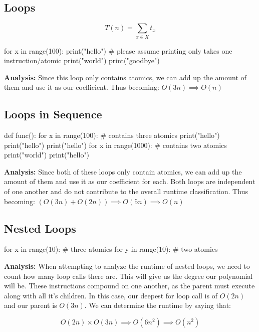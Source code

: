 \documentclass{article}
\begin{document}
\subsection{Loops}

$$T(n) = \sum_{x \in X} t_{x}$$

\begin{flushleft}

\begin{python}
for x in range(100):
    print("hello") # please assume printing only takes one instruction/atomic
    print("world")
    print("goodbye")
\end{python}

\textbf{Analysis:} Since this loop only contains atomics, we can add up the amount of them and use it as our coefficient. Thus becoming: $O(3n) \implies O(n)$

\end{flushleft}

\subsection{Loops in Sequence}

\begin{flushleft}
\begin{python}
def func():
    for x in range(100):
        # contains three atomics
        print("hello")
        print("hello")
        print("hello")
    for x in range(1000):
        # contains two atomics
        print("world")
        print("hello")
\end{python}

\textbf{Analysis:} Since both of these loops only contain atomics, we can add up the amount of them and use it as our coefficient for each. Both loops are independent of one another and do not contribute to the overall runtime classification. Thus becoming: $( O(3n) + O(2n) ) \implies O(5n) \implies O(n)$

\end{flushleft}


\subsection{Nested Loops}

\begin{flushleft}

\begin{python}
for x in range(10):
    # three atomics
    for y in range(10):
        # two atomics
\end{python}

\textbf{Analysis:} When attempting to analyze the runtime of nested loops, we need to count how many loop calls there are. This will give us the degree our polynomial will be. These instructions compound on one another, as the parent must execute along with all it's children. In this case, our deepest for loop call is of $O(2n)$ and our parent is $O(3n)$. We can determine the runtime by saying that:

$$O(2n) \times O(3n) \implies O(6n^{2}) \implies O(n^{2})$$

\end{flushleft}
\end{document}
